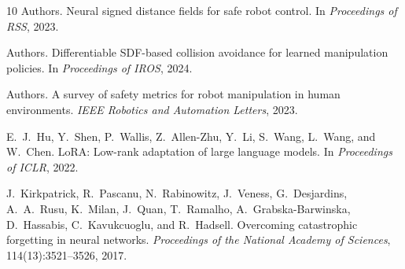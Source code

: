 \documentclass[10pt,letterpaper]{article}
\begin{document}
{\begin{thebibliography}{10}
{Authors}.
\newblock Neural signed distance fields for safe robot control.
\newblock In \emph{Proceedings of RSS}, 2023.

{Authors}.
\newblock Differentiable SDF-based collision avoidance for learned manipulation policies.
\newblock In \emph{Proceedings of IROS}, 2024.

{Authors}.
\newblock A survey of safety metrics for robot manipulation in human environments.
\newblock \emph{IEEE Robotics and Automation Letters}, 2023.

E.~J.~Hu, Y.~Shen, P.~Wallis, Z.~Allen-Zhu, Y.~Li, S.~Wang, L.~Wang, and W.~Chen.
\newblock LoRA: Low-rank adaptation of large language models.
\newblock In \emph{Proceedings of ICLR}, 2022.

J.~Kirkpatrick, R.~Pascanu, N.~Rabinowitz, J.~Veness, G.~Desjardins, A.~A.~Rusu, K.~Milan, J.~Quan, T.~Ramalho, A.~Grabska-Barwinska, D.~Hassabis, C.~Kavukcuoglu, and R.~Hadsell.
\newblock Overcoming catastrophic forgetting in neural networks.
\newblock \emph{Proceedings of the National Academy of Sciences}, 114(13):3521--3526, 2017.

\end{thebibliography}
}
\end{document}
